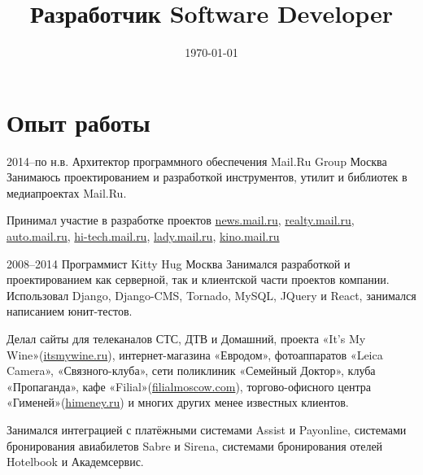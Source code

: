 \documentclass[11pt,a4paper,sans]{moderncv}
\title
    {\lang
        {Разработчик}
        {Software Developer}}
\date{\today}
\newcommand{\lang}[2]{#1}
\begin{document}
\makecvtitle


\section
    {\lang
        {Опыт работы}
        {Work Experience}}


\cventry
    {2014--\lang
        {по н.в.}
        {Present}}
    {\lang
        {Архитектор программного обеспечения}
        {Software Architect}}
    {Mail.Ru Group}
    {\lang
        {Москва}
        {Moscow}}
    {}
    {\lang
        {Занимаюсь проектированием и разработкой инструментов, утилит и библиотек в медиапроектах Mail.Ru.}
        {Design and develop tools, utilities and libraries for Media Projects Mail.Ru}}

\cvlistitem
    {\lang 
        {Принимал участие в разработке проектов \href{https://news.mail.ru}{news.mail.ru}, \href{https://realty.mail.ru}{realty.mail.ru}, \href{https://auto.mail.ru}{auto.mail.ru}, \href{https://hi-tech.mail.ru}{hi-tech.mail.ru}, \href{https://lady.mail.ru}{lady.mail.ru}, \href{https://kino.mail.ru}{kino.mail.ru}}
        {Actively participated in development of such projects as \href{https://news.mail.ru}{news.mail.ru}, \href{https://realty.mail.ru}{realty.mail.ru}, \href{https://auto.mail.ru}{auto.mail.ru}, \href{https://hi-tech.mail.ru}{hi-tech.mail.ru}, \href{https://lady.mail.ru}{lady.mail.ru}, \href{https://kino.mail.ru}{kino.mail.ru}}\newline}


\cventry
    {2008--2014}
    {\lang
        {Программист}
        {Software Developer}}
    {Kitty Hug}
    {\lang
        {Москва}
        {Moscow}}
    {}
    {\lang
        {Занимался разработкой и проектированием как серверной, так и клиентской части проектов компании. Использовал Django, Django-CMS, Tornado, MySQL, JQuery и React, занимался написанием юнит-тестов.}
        {Designed and developed ... TODO}}

\cvlistitem
    {\lang
        {Делал сайты для телеканалов СТС, ДТВ и Домашний, проекта «It's My Wine»(\href{http://itsmywine.ru}{itsmywine.ru}), интернет-магазина «Евродом», фотоаппаратов «Leica Camera», «Связного-клуба», сети поликлиник «Семейный Доктор», клуба «Пропаганда», кафе «Filial»(\href{http://filialmoscow.com/ru/}{filialmoscow.com}), торгово-офисного центра «Гименей»(\href{http://himeney.ru}{himeney.ru}) и многих других менее известных клиентов.}
        {TODO}}

\cvlistitem
    {\lang
        {Занимался интеграцией с платёжными системами Assist и Payonline, системами бронирования авиабилетов Sabre и Sirena, системами бронирования отелей Hotelbook и Академсервис.}
        {TODO}}
\end{document}
